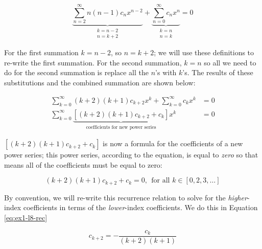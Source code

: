 \begin{equation*}
\underbrace{\sum\limits_{n=2}^{\infty} n(n-1)c_nx^{n-2}}_{\substack{k=n-2 \\ n=k+2}} + \underbrace{\sum\limits_{n=0}^{\infty} c_n x^n}_{\substack{k=n \\ n=k}} = 0
\end{equation*}

\noindent For the first summation $k=n-2$, so $n=k+2$; we will use these definitions to re-write the first summation.  For the second summation, $k=n$ so all we need to do for the second summation is replace all the $n$'s with $k$'s.  The results of these substitutions and the combined summation are shown below:

\begin{align*}
\sum\limits_{k=0}^{\infty} (k+2)(k+1)c_{k+2}x^k + \sum\limits_{k=0}^{\infty} c_k x^k &= 0 \\
\sum\limits_{k=0}^{\infty}\underbrace{\left[(k+2)(k+1)c_{k+2} + c_k \right]}_{\text{coefficients for new power series}}x^k&=0
\end{align*}

 $\left[(k+2)(k+1)c_{k+2}+c_k \right]$ is now a formula for the coefficients of a new power series; this power series, according to the equation, is equal to \emph{zero} so that means all of the coefficients must be equal to zero:

\begin{equation*}
(k+2)(k+1)c_{k+2} + c_{k} = 0, \ \ \text{for all } k \in [0,2,3,\dots]
\end{equation*} 


By convention, we will re-write this recurrence relation to solve for the \emph{higher}-index coefficients in terms of the \emph{lower}-index coefficients.  We do this in Equation \ref{eq:ex1-l8-rec}

\begin{equation}
c_{k+2}=-\frac{c_k}{(k+2)(k+1)}
\label{eq:ex1-l8-rec}
\end{equation}

